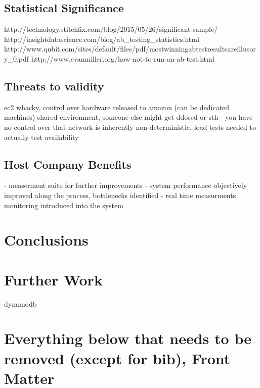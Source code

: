\documentclass{uvamscse}
\begin{document}
\section{Statistical Significance}
http://technology.stitchfix.com/blog/2015/05/26/significant-sample/
http://insightdatascience.com/blog/ab\_testing\_statistics.html
http://www.qubit.com/sites/default/files/pdf/mostwinningabtestresultsareillusory\_0.pdf
http://www.evanmiller.org/how-not-to-run-an-ab-test.html


\section{Threats to validity}
ec2 whacky, control over hardware released to amazon (can be dedicated machines)
shared environment, someone else might get ddosed or sth - you have no control over that
network is inherently non-deterministic, load tests needed to actually test availability

\section{Host Company Benefits}
- measerment suite for further improvements
- system performance objectively improved along the process, bottlenecks identified
- real time measurments monitoring introduced into the system

\chapter{Conclusions}\label{Conclusions}

\chapter{Further Work}\label{Further Work}
dynamodb

\chapter{Everything below that needs to be removed (except for bib), Front Matter}
\end{document}
